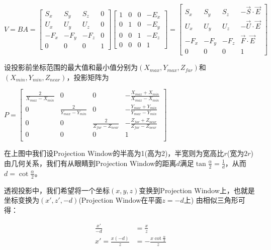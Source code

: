 \documentclass[UTF8]{ctexart}
\begin{document}
$V = BA = \begin{bmatrix} S_x & S_y & S_z & 0 \\
    U_x & U_y & U_z & 0 \\
    -F_x & -F_y & -F_z & 0 \\
    0   &   0 &    0 & 1 

\end{bmatrix} \begin{bmatrix} 1 & 0 & 0 & -E_x \\
    0 & 1 & 0 & -E_y \\
    0 & 0 & 1 & -E_z \\
    0   &   0 &    0 & 1 
\end{bmatrix}
= \begin{bmatrix} S_x & S_y & S_z & -\vec S \cdot \vec E \\
                          U_x & U_y & U_z & -\vec U \cdot \vec E \\
                          -F_x & -F_y & -F_z & \vec F \cdot \vec E \\
                          0 & 0 & 0 & 1
\end{bmatrix}$

\newpage 

设投影前坐标范围的最大值和最小值分别为$(X_{max}, Y_{max}, Z_{far})$和$(X_{min}, Y_{min}, Z_{near})$，投影矩阵为

$P = \begin{bmatrix} 
\frac{2}{X_{max}-X_{min}} & 0 & 0 & -\frac{X_{max}+X_{min}}{X_{max}-X_{min}}\\
0 & \frac{2}{Y_{max}-Y_{min}} & 0 & -\frac{Y_{max}+Y_{min}}{Y_{max}-Y_{min}}\\
0 & 0 & \frac{2}{Z_{far}-Z_{near}} & -\frac{Z_{far}+Z_{near}}{Z_{far}-Z_{near}}\\
0 & 0 & 0 & 1\\ \end{bmatrix}$

\newpage 

在上图中我们设Projection Window的半高为1(高为2)，半宽则为宽高比$r$(宽为$2r$)
由几何关系，我们有从眼睛到Projection Window的距离$d$满足$\tan\frac{\alpha}{2} = \frac{1}{d}$，从而$d = \cot\frac{\alpha}{2}$。

透视投影中，我们希望将一个坐标$(x,y,z)$变换到Projection Window上，也就是坐标变换为$(x', z', -d)$(Projection Window在平面$z=-d$上)
由相似三角形可得：

\begin{align}
\frac{x'}{-d} &= \frac{x}{z} \\
x' = \frac{x(-d)}{z} &= -\frac{x\cot\frac{\alpha}{2}}{z}
\end{align}
\end{document}

